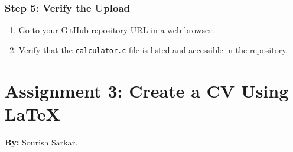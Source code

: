 \documentclass[a4paper,12pt]{article}
\begin{document}
\subsubsection{Step 5: Verify the Upload}
\begin{enumerate}
    \item Go to your GitHub repository URL in a web browser.
    \item Verify that the \texttt{calculator.c} file is listed and accessible in the repository.
\end{enumerate}

\newpage

\section{Assignment 3: Create a CV Using LaTeX}

\textbf{By:} Sourish Sarkar.
\end{document}
